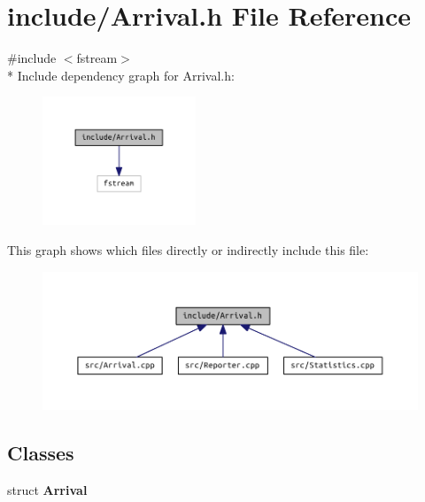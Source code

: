 \section{include/\+Arrival.h File Reference}
\label{_arrival_8h}
{\ttfamily \#include $<$fstream$>$}\\*
Include dependency graph for Arrival.\+h\+:
\nopagebreak
\begin{figure}[H]
\begin{center}
\leavevmode
\includegraphics[width=130pt]{_arrival_8h__incl}
\end{center}
\end{figure}
This graph shows which files directly or indirectly include this file\+:
\nopagebreak
\begin{figure}[H]
\begin{center}
\leavevmode
\includegraphics[width=343pt]{_arrival_8h__dep__incl}
\end{center}
\end{figure}
\subsection*{Classes}
\begin{DoxyCompactItemize}
\item 
struct {\bf Arrival}
\end{DoxyCompactItemize}

